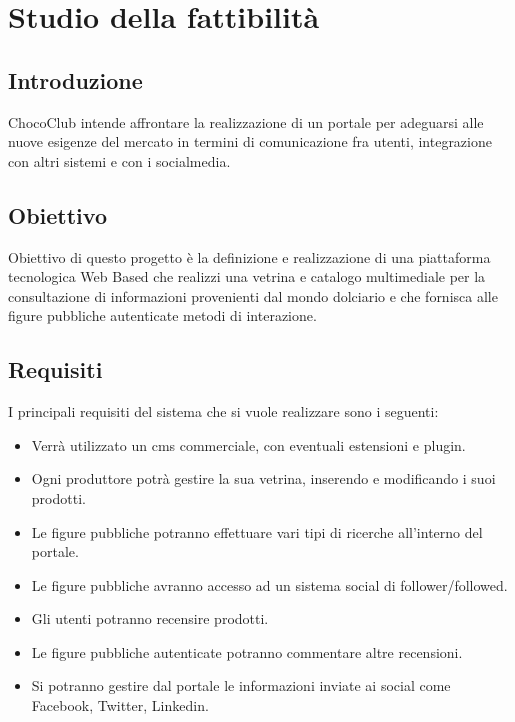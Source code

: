 \chapter{Studio della fattibilità} %
\label{cha:studio_della_fattibilita}

\section{Introduzione} 
\label{sec:realizzabilita_sistema}
ChocoClub intende affrontare la realizzazione di un portale per adeguarsi alle nuove esigenze del mercato in 
termini di comunicazione fra utenti, integrazione con altri sistemi e con i socialmedia.

\section{Obiettivo} 
\label{sec:obiettivo}
Obiettivo di questo progetto è la definizione e realizzazione di una piattaforma tecnologica Web Based
che realizzi una vetrina e catalogo multimediale per la consultazione di informazioni provenienti dal mondo dolciario e che fornisca alle figure pubbliche autenticate metodi di interazione.

\section{Requisiti} 
\label{sec:requisiti}
I principali requisiti del sistema che si vuole realizzare sono i seguenti:
\begin{itemize}
	\item Verrà utilizzato un \gls{cms} commerciale, con eventuali estensioni e plugin.

	\item Ogni produttore potrà gestire la sua vetrina, inserendo e modificando i suoi prodotti.

	\item Le figure pubbliche potranno effettuare vari tipi di ricerche all'interno del portale. 

	\item Le figure pubbliche avranno accesso ad un sistema social di follower/followed.

	\item Gli utenti potranno recensire prodotti.

	\item Le figure pubbliche autenticate potranno commentare altre recensioni.



	\item Si potranno gestire dal portale le informazioni inviate ai social come Facebook, Twitter, Linkedin.
\end{itemize}



